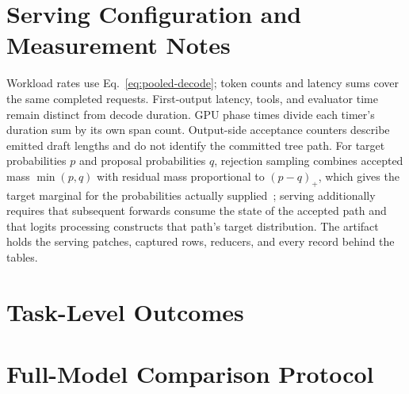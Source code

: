 \documentclass[sigconf,anonymous,review]{acmart}
\begin{document}



\appendix
\section{Serving Configuration and Measurement Notes}
\label{app:settings}

Workload rates use Eq.~\ref{eq:pooled-decode}; token counts and latency sums cover the same completed requests. First-output latency, tools, and evaluator time remain distinct from decode duration. GPU phase times divide each timer's duration sum by its own span count. Output-side acceptance counters describe emitted draft lengths and do not identify the committed tree path. For target probabilities $p$ and proposal probabilities $q$, rejection sampling combines accepted mass $\min(p,q)$ with residual mass proportional to $(p-q)_+$, which gives the target marginal for the probabilities actually supplied~\cite{leviathan2023fast,chen2023sampling}; serving additionally requires that subsequent forwards consume the state of the accepted path and that logits processing constructs that path's target distribution. The artifact~\cite{anon2026artifact} holds the serving patches, captured rows, reducers, and every record behind the tables.

\section{Task-Level Outcomes}
\label{app:workload}


\section{Full-Model Comparison Protocol}
\label{app:fullmodel-protocol}

\end{document}
